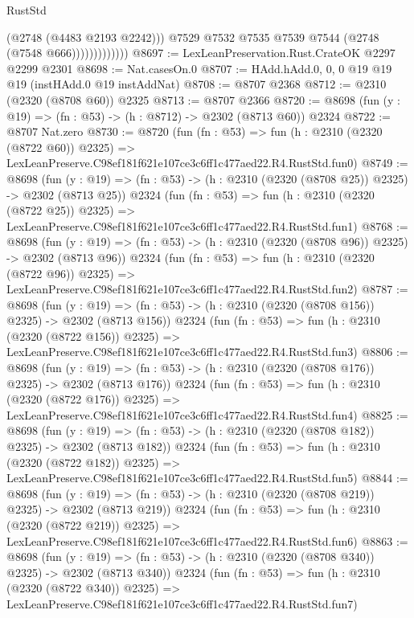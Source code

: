 \begin{lexlean}{RustStd}
\begin{coremodule}
                            (@2748 (@4483 @2193 @2242)))
                          @7529
                          @7532
                          @7535
                          @7539
                          @7544
                          (@2748 (@7548 @666)))))))))))))
@8697 := LexLeanPreservation.Rust.CrateOK @2297 @2299 @2301
@8698 := Nat.casesOn.{0}
@8707 := HAdd.hAdd.{0, 0, 0} @19 @19 @19 (instHAdd.{0} @19 instAddNat)
@8708 := @8707 @2368
@8712 := @2310 (@2320 (@8708 @60)) @2325
@8713 := @8707 @2366
@8720 := @8698 (fun (y : @19) => (fn : @53) -> (h : @8712) -> @2302 (@8713 @60)) @2324
@8722 := @8707 Nat.zero
@8730 := @8720
    (fun (fn : @53) =>
    fun (h : @2310 (@2320 (@8722 @60)) @2325) =>
    LexLeanPreserve.C98ef181f621e107ce3c6ff1c477aed22.R4.RustStd.fun0)
@8749 := @8698
    (fun (y : @19) => (fn : @53) -> (h : @2310 (@2320 (@8708 @25)) @2325) -> @2302 (@8713 @25))
    @2324
    (fun (fn : @53) =>
    fun (h : @2310 (@2320 (@8722 @25)) @2325) =>
    LexLeanPreserve.C98ef181f621e107ce3c6ff1c477aed22.R4.RustStd.fun1)
@8768 := @8698
    (fun (y : @19) => (fn : @53) -> (h : @2310 (@2320 (@8708 @96)) @2325) -> @2302 (@8713 @96))
    @2324
    (fun (fn : @53) =>
    fun (h : @2310 (@2320 (@8722 @96)) @2325) =>
    LexLeanPreserve.C98ef181f621e107ce3c6ff1c477aed22.R4.RustStd.fun2)
@8787 := @8698
    (fun (y : @19) => (fn : @53) -> (h : @2310 (@2320 (@8708 @156)) @2325) -> @2302 (@8713 @156))
    @2324
    (fun (fn : @53) =>
    fun (h : @2310 (@2320 (@8722 @156)) @2325) =>
    LexLeanPreserve.C98ef181f621e107ce3c6ff1c477aed22.R4.RustStd.fun3)
@8806 := @8698
    (fun (y : @19) => (fn : @53) -> (h : @2310 (@2320 (@8708 @176)) @2325) -> @2302 (@8713 @176))
    @2324
    (fun (fn : @53) =>
    fun (h : @2310 (@2320 (@8722 @176)) @2325) =>
    LexLeanPreserve.C98ef181f621e107ce3c6ff1c477aed22.R4.RustStd.fun4)
@8825 := @8698
    (fun (y : @19) => (fn : @53) -> (h : @2310 (@2320 (@8708 @182)) @2325) -> @2302 (@8713 @182))
    @2324
    (fun (fn : @53) =>
    fun (h : @2310 (@2320 (@8722 @182)) @2325) =>
    LexLeanPreserve.C98ef181f621e107ce3c6ff1c477aed22.R4.RustStd.fun5)
@8844 := @8698
    (fun (y : @19) => (fn : @53) -> (h : @2310 (@2320 (@8708 @219)) @2325) -> @2302 (@8713 @219))
    @2324
    (fun (fn : @53) =>
    fun (h : @2310 (@2320 (@8722 @219)) @2325) =>
    LexLeanPreserve.C98ef181f621e107ce3c6ff1c477aed22.R4.RustStd.fun6)
@8863 := @8698
    (fun (y : @19) => (fn : @53) -> (h : @2310 (@2320 (@8708 @340)) @2325) -> @2302 (@8713 @340))
    @2324
    (fun (fn : @53) =>
    fun (h : @2310 (@2320 (@8722 @340)) @2325) =>
    LexLeanPreserve.C98ef181f621e107ce3c6ff1c477aed22.R4.RustStd.fun7)

\end{coremodule}
\end{lexlean}
